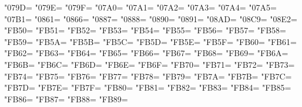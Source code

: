 \XeTeXcharclass"079D=\KclassArabU
\XeTeXcharclass"079E=\KclassArabU
\XeTeXcharclass"079F=\KclassArabU
\XeTeXcharclass"07A0=\KclassArabU
\XeTeXcharclass"07A1=\KclassArabU
\XeTeXcharclass"07A2=\KclassArabU
\XeTeXcharclass"07A3=\KclassArabU
\XeTeXcharclass"07A4=\KclassArabU
\XeTeXcharclass"07A5=\KclassArabU
\XeTeXcharclass"07B1=\KclassArabU
\XeTeXcharclass"0861=\KclassArabU
\XeTeXcharclass"0866=\KclassArabU
\XeTeXcharclass"0887=\KclassArabU
\XeTeXcharclass"0888=\KclassArabU
\XeTeXcharclass"0890=\KclassArabU
\XeTeXcharclass"0891=\KclassArabU
\XeTeXcharclass"08AD=\KclassArabU
\XeTeXcharclass"08C9=\KclassArabU
\XeTeXcharclass"08E2=\KclassArabU
\XeTeXcharclass"FB50=\KclassArabU
\XeTeXcharclass"FB51=\KclassArabU
\XeTeXcharclass"FB52=\KclassArabU
\XeTeXcharclass"FB53=\KclassArabU
\XeTeXcharclass"FB54=\KclassArabU
\XeTeXcharclass"FB55=\KclassArabU
\XeTeXcharclass"FB56=\KclassArabU
\XeTeXcharclass"FB57=\KclassArabU
\XeTeXcharclass"FB58=\KclassArabU
\XeTeXcharclass"FB59=\KclassArabU
\XeTeXcharclass"FB5A=\KclassArabU
\XeTeXcharclass"FB5B=\KclassArabU
\XeTeXcharclass"FB5C=\KclassArabU
\XeTeXcharclass"FB5D=\KclassArabU
\XeTeXcharclass"FB5E=\KclassArabU
\XeTeXcharclass"FB5F=\KclassArabU
\XeTeXcharclass"FB60=\KclassArabU
\XeTeXcharclass"FB61=\KclassArabU
\XeTeXcharclass"FB62=\KclassArabU
\XeTeXcharclass"FB63=\KclassArabU
\XeTeXcharclass"FB64=\KclassArabU
\XeTeXcharclass"FB65=\KclassArabU
\XeTeXcharclass"FB66=\KclassArabU
\XeTeXcharclass"FB67=\KclassArabU
\XeTeXcharclass"FB68=\KclassArabU
\XeTeXcharclass"FB69=\KclassArabU
\XeTeXcharclass"FB6A=\KclassArabU
\XeTeXcharclass"FB6B=\KclassArabU
\XeTeXcharclass"FB6C=\KclassArabU
\XeTeXcharclass"FB6D=\KclassArabU
\XeTeXcharclass"FB6E=\KclassArabU
\XeTeXcharclass"FB6F=\KclassArabU
\XeTeXcharclass"FB70=\KclassArabU
\XeTeXcharclass"FB71=\KclassArabU
\XeTeXcharclass"FB72=\KclassArabU
\XeTeXcharclass"FB73=\KclassArabU
\XeTeXcharclass"FB74=\KclassArabU
\XeTeXcharclass"FB75=\KclassArabU
\XeTeXcharclass"FB76=\KclassArabU
\XeTeXcharclass"FB77=\KclassArabU
\XeTeXcharclass"FB78=\KclassArabU
\XeTeXcharclass"FB79=\KclassArabU
\XeTeXcharclass"FB7A=\KclassArabU
\XeTeXcharclass"FB7B=\KclassArabU
\XeTeXcharclass"FB7C=\KclassArabU
\XeTeXcharclass"FB7D=\KclassArabU
\XeTeXcharclass"FB7E=\KclassArabU
\XeTeXcharclass"FB7F=\KclassArabU
\XeTeXcharclass"FB80=\KclassArabU
\XeTeXcharclass"FB81=\KclassArabU
\XeTeXcharclass"FB82=\KclassArabU
\XeTeXcharclass"FB83=\KclassArabU
\XeTeXcharclass"FB84=\KclassArabU
\XeTeXcharclass"FB85=\KclassArabU
\XeTeXcharclass"FB86=\KclassArabU
\XeTeXcharclass"FB87=\KclassArabU
\XeTeXcharclass"FB88=\KclassArabU
\XeTeXcharclass"FB89=\KclassArabU
